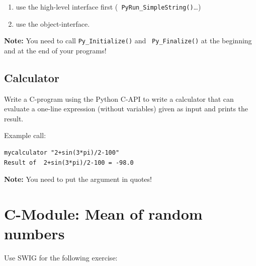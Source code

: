 \documentclass[12pt]{scrartcl}
\begin{document}
\begin{enumerate}
\item use the high-level interface first ({\tt
  PyRun\_SimpleString()}\ldots)
\item use the object-interface.
\end{enumerate}

{\bf Note:} You need to call {\tt Py\_Initialize()} and {\tt
  Py\_Finalize()} at the beginning and at the end of your programs!

\subsection{Calculator}

Write a C-program using the Python C-API to write a calculator that
can evaluate a one-line expression (without variables) given as input
and prints the result.

Example call:

\begin{lstlisting}
mycalculator "2+sin(3*pi)/2-100"
Result of  2+sin(3*pi)/2-100 = -98.0
\end{lstlisting}

{\bf Note:} You need to put the argument in quotes!



\section{C-Module: Mean of random numbers}

Use SWIG for the following exercise:
\end{document}
